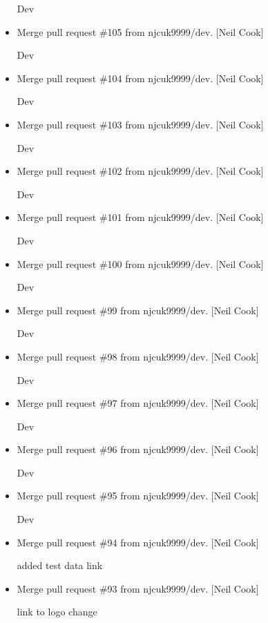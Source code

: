 \documentclass[a4paper,10pt,english]{report}
\begin{document}
\begin{itemize}
Dev

\item {} 
Merge pull request \#105 from njcuk9999/dev. {[}Neil Cook{]}

Dev

\item {} 
Merge pull request \#104 from njcuk9999/dev. {[}Neil Cook{]}

Dev

\item {} 
Merge pull request \#103 from njcuk9999/dev. {[}Neil Cook{]}

Dev

\item {} 
Merge pull request \#102 from njcuk9999/dev. {[}Neil Cook{]}

Dev

\item {} 
Merge pull request \#101 from njcuk9999/dev. {[}Neil Cook{]}

Dev

\item {} 
Merge pull request \#100 from njcuk9999/dev. {[}Neil Cook{]}

Dev

\item {} 
Merge pull request \#99 from njcuk9999/dev. {[}Neil Cook{]}

Dev

\item {} 
Merge pull request \#98 from njcuk9999/dev. {[}Neil Cook{]}

Dev

\item {} 
Merge pull request \#97 from njcuk9999/dev. {[}Neil Cook{]}

Dev

\item {} 
Merge pull request \#96 from njcuk9999/dev. {[}Neil Cook{]}

Dev

\item {} 
Merge pull request \#95 from njcuk9999/dev. {[}Neil Cook{]}

Dev

\item {} 
Merge pull request \#94 from njcuk9999/dev. {[}Neil Cook{]}

added test data link

\item {} 
Merge pull request \#93 from njcuk9999/dev. {[}Neil Cook{]}

link to logo change

\end{itemize}
\end{document}
